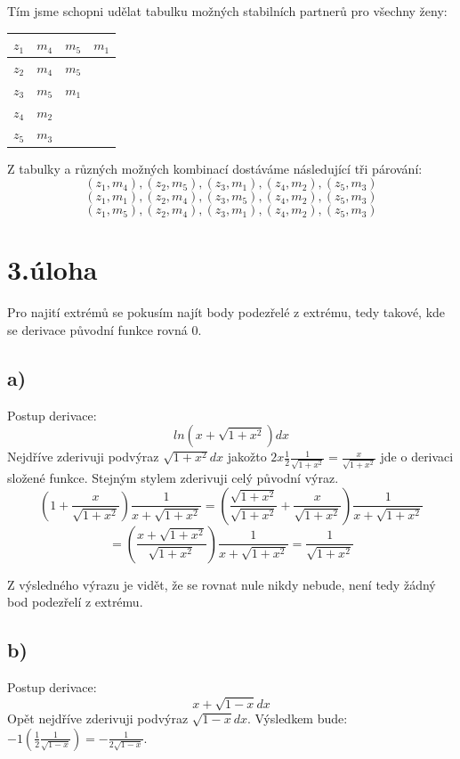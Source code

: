 \documentclass[a4paper, 11pt]{article}
\begin{document}
  Tím jsme schopni udělat tabulku možných stabilních partnerů pro všechny ženy:
  
  \begin{table}[h]
    \begin{tabular}{|l||l|l|l|}
    \hline
      $z_1$& $m_4$ & $m_5$  & $m_1$\\ \hline
      $z_2$& $m_4$ & $m_5$ &\\ \hline
      $z_3$& $m_5$ & $m_1$ &\\ \hline
      $z_4$& $m_2$ &  &\\ \hline
      $z_5$& $m_3$ &  & \\ \hline
    \end{tabular}
  \end{table}

  Z tabulky a různých možných kombinací dostáváme následující tři párování:
  $$(z_1,m_4),(z_2,m_5),(z_3,m_1),(z_4,m_2),(z_5,m_3)$$
  $$(z_1,m_1),(z_2,m_4),(z_3,m_5),(z_4,m_2),(z_5,m_3)$$
  $$(z_1,m_5),(z_2,m_4),(z_3,m_1),(z_4,m_2),(z_5,m_3)$$
  
\section*{3.úloha}
    Pro najití extrémů se pokusím najít body podezřelé z extrému, tedy takové, kde se derivace původní funkce rovná 0.
  \subsection*{a)}
    Postup derivace:
    $$ln(x+\sqrt{1+x^2}) dx$$
    Nejdříve zderivuji podvýraz $\sqrt{1+x^2} dx$ jakožto $2x\frac{1}{2} \frac{1}{\sqrt{1+x^2}} = \frac{x}{\sqrt{1+x^2}}$ jde o derivaci složené funkce. Stejným stylem zderivuji celý původní výraz.
    $$(1+\frac{x}{\sqrt{1+x^2}})\frac{1}{x+\sqrt{1+x^2}} = (\frac{\sqrt{1+x^2}}{\sqrt{1+x^2}}+\frac{x}{\sqrt{1+x^2}})\frac{1}{x+\sqrt{1+x^2}}$$
    $$ =( \frac{x + \sqrt{1+x^2}}{\sqrt{1+x^2}})\frac{1}{x+\sqrt{1+x^2}} = \frac{1}{\sqrt{1+x^2}}$$
    
    Z výsledného výrazu je vidět, že se rovnat nule nikdy nebude, není tedy žádný bod podezřelí z extrému.
    
  \subsection*{b)}
   Postup derivace:
   $$x+\sqrt{1-x} dx$$
   Opět nejdříve zderivuji podvýraz $\sqrt{1-x} dx$. Výsledkem bude: $-1(\frac{1}{2}\frac{1}{\sqrt{1-x}}) = -\frac{1}{2\sqrt{1-x}}$. 
   
\end{document}
